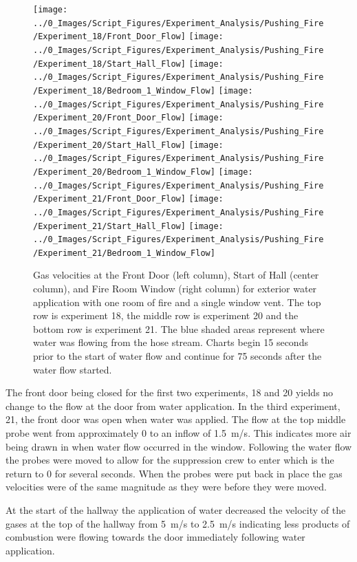 \documentclass[12pt,oneside]{book}
\begin{document}
\begin{figure}[H]
\centering
\texttt{[image: ../0\_Images/Script\_Figures/Experiment\_Analysis/Pushing\_Fire/Experiment\_18/Front\_Door\_Flow]}
\texttt{[image: ../0\_Images/Script\_Figures/Experiment\_Analysis/Pushing\_Fire/Experiment\_18/Start\_Hall\_Flow]}
\texttt{[image: ../0\_Images/Script\_Figures/Experiment\_Analysis/Pushing\_Fire/Experiment\_18/Bedroom\_1\_Window\_Flow]}
\texttt{[image: ../0\_Images/Script\_Figures/Experiment\_Analysis/Pushing\_Fire/Experiment\_20/Front\_Door\_Flow]}
\texttt{[image: ../0\_Images/Script\_Figures/Experiment\_Analysis/Pushing\_Fire/Experiment\_20/Start\_Hall\_Flow]}
\texttt{[image: ../0\_Images/Script\_Figures/Experiment\_Analysis/Pushing\_Fire/Experiment\_20/Bedroom\_1\_Window\_Flow]}
\texttt{[image: ../0\_Images/Script\_Figures/Experiment\_Analysis/Pushing\_Fire/Experiment\_21/Front\_Door\_Flow]}
\texttt{[image: ../0\_Images/Script\_Figures/Experiment\_Analysis/Pushing\_Fire/Experiment\_21/Start\_Hall\_Flow]}
\texttt{[image: ../0\_Images/Script\_Figures/Experiment\_Analysis/Pushing\_Fire/Experiment\_21/Bedroom\_1\_Window\_Flow]}
\caption[Gas Velocities - Single Room of Fire - Exterior]{Gas velocities at the Front Door (left column), Start of Hall (center column), and Fire Room Window (right column) for exterior water application with one room of fire and a single window vent. The top row is experiment 18, the middle row is experiment 20 and the bottom row is experiment 21. The blue shaded areas represent where water was flowing from the hose stream. Charts begin 15 seconds prior to the start of water flow and continue for 75 seconds after the water flow started.}
\label{fig:push_fire_exterior}
\end{figure}

The front door being closed for the first two experiments, 18 and 20 yields no change to the flow at the door from water application. In the third experiment, 21, the front door was open when water was applied. The flow at the top middle probe went from approximately 0 to an inflow of 1.5~m/s. This indicates more air being drawn in when water flow occurred in the window. Following the water flow the probes were moved to allow for the suppression crew to enter which is the return to 0 for several seconds. When the probes were put back in place the gas velocities were of the same magnitude as they were before they were moved. 

At the start of the hallway the application of water decreased the velocity of the gases at the top of the hallway from 5~m/s to 2.5~m/s indicating less products of combustion were flowing towards the door immediately following water application.
\end{document}
